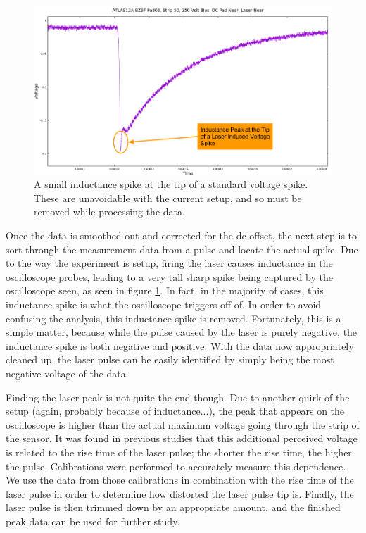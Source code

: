 \documentclass{report}
\begin{document}
            \begin{figure}[h] 
                \includegraphics[height=.4\textheight]{inductance_peak}
                \centering
                \caption{ A small inductance spike at the tip of a standard voltage spike. These are unavoidable with the current setup, and so must be removed while processing the data. }
                \label{fig:inductance_peak}
            \end{figure}

            Once the data is smoothed out and corrected for the dc offset, the next step is to sort through the measurement data from a pulse and locate the actual spike. Due to the way the experiment is setup, firing the laser causes inductance in the oscilloscope probes, leading to a very tall sharp spike being captured by the oscilloscope seen, as seen in figure \ref{fig:inductance_peak}. In fact, in the majority of cases, this inductance spike is what the oscilloscope triggers off of. In order to avoid confusing the analysis, this inductance spike is removed. Fortunately, this is a simple matter, because while the pulse caused by the laser is purely negative, the inductance spike is both negative and positive. With the data now appropriately cleaned up, the laser pulse can be easily identified by simply being the most negative voltage of the data.

            Finding the laser peak is not quite the end though. Due to another quirk of the setup (again, probably because of inductance...), the peak that appears on the oscilloscope is higher than the actual maximum voltage going through the strip of the sensor. It was found in previous studies that this additional perceived voltage is related to the rise time of the laser pulse; the shorter the rise time, the higher the pulse. Calibrations were performed to accurately measure this dependence. We use the data from those calibrations in combination with the rise time of the laser pulse in order to determine how distorted the laser pulse tip is. Finally, the laser pulse is then trimmed down by an appropriate amount, and the finished peak data can be used for further study.
\end{document}
